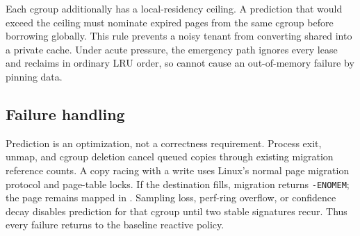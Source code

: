 Each cgroup additionally has a local-residency ceiling.  A prediction that
would exceed the ceiling must nominate expired pages from the same cgroup
before borrowing globally.  This rule prevents a noisy tenant from converting
shared \fast into a private cache.  Under acute pressure, the emergency path
ignores every lease and reclaims in ordinary LRU order, so \system cannot cause
an out-of-memory failure by pinning data.

\subsection{Failure handling}

Prediction is an optimization, not a correctness requirement.  Process exit,
unmap, and cgroup deletion cancel queued copies through existing migration
reference counts.  A copy racing with a write uses Linux's normal page
migration protocol and page-table locks.  If the destination fills, migration
returns \texttt{-ENOMEM}; the page remains mapped in \slow.  Sampling loss,
perf-ring overflow, or confidence decay disables prediction for that cgroup
until two stable signatures recur.  Thus every failure returns to the baseline
reactive policy.
